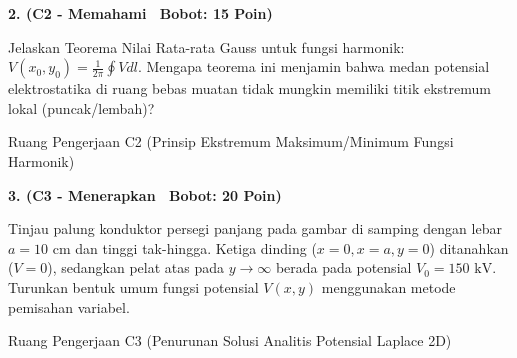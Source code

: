 \documentclass[10pt,a4paper]{article}
\begin{document}
\vspace{1mm}

\noindent\textbf{2. (C2 - Memahami \textbar\ Bobot: 15 Poin)}\par\vspace{0.5mm}
{\footnotesize Jelaskan Teorema Nilai Rata-rata Gauss untuk fungsi harmonik: $V(x_0, y_0) = \frac{1}{2\pi} \oint V dl$. Mengapa teorema ini menjamin bahwa medan potensial elektrostatika di ruang bebas muatan tidak mungkin memiliki titik ekstremum lokal (puncak/lembah)?}
\begin{answerbox}{Ruang Pengerjaan C2 (Prinsip Ekstremum Maksimum/Minimum Fungsi Harmonik)}
  \vspace{2.1cm}
\end{answerbox}

\vspace{1mm}

\noindent\textbf{3. (C3 - Menerapkan \textbar\ Bobot: 20 Poin)}\par\vspace{0.5mm}
\noindent\begin{minipage}[t]{0.60\textwidth}%
  {\footnotesize Tinjau palung konduktor persegi panjang pada gambar di samping dengan lebar $a=10\text{ cm}$ dan tinggi tak-hingga. Ketiga dinding ($x=0, x=a, y=0$) ditanahkan ($V=0$), sedangkan pelat atas pada $y \to \infty$ berada pada potensial $V_0 = 150\text{ kV}$. Turunkan bentuk umum fungsi potensial $V(x,y)$ menggunakan metode pemisahan variabel.}%
\end{minipage}%
\hfill%
\begin{minipage}[t]{0.37\textwidth}%
  \centering
\end{minipage}\par\vspace{1mm}
\begin{answerbox}{Ruang Pengerjaan C3 (Penurunan Solusi Analitis Potensial Laplace 2D)}
  \vspace{2.8cm}
\end{answerbox}
\end{document}
